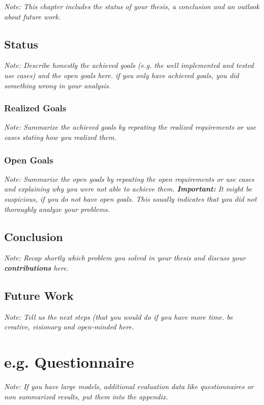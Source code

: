 \documentclass[a4paper,12pt,twoside]{report}
\begin{document}
\textit{Note: This chapter includes the status of your thesis, a conclusion and an outlook about future work.}

\section{Status}

\textit{Note: Describe honestly the achieved goals (e.g. the well implemented and tested use cases) and the open goals here. if you only have achieved goals, you did something wrong in your analysis.}

\subsection{Realized Goals}

\textit{Note: Summarize the achieved goals by repeating the realized requirements or use cases stating how you realized them.}

\subsection{Open Goals}

\textit{Note: Summarize the open goals by repeating the open requirements or use cases and explaining why you were not able to achieve them. \textbf{Important:} It might be suspicious, if you do not have open goals. This usually indicates that you did not thoroughly analyze your problems.}

\section{Conclusion}

\textit{Note: Recap shortly which problem you solved in your thesis and discuss your \textbf{contributions} here.}

\section{Future Work}

\textit{Note: Tell us the next steps  (that you would do if you have more time. be creative, visionary and open-minded here.}



\appendix

\chapter{e.g. Questionnaire}

\textit{Note: If you have large models, additional evaluation data like questionnaires or non summarized results, put them into the appendix.}


\clearpage

\listoffigures
\clearpage

\listoftables
\clearpage



\end{document}
